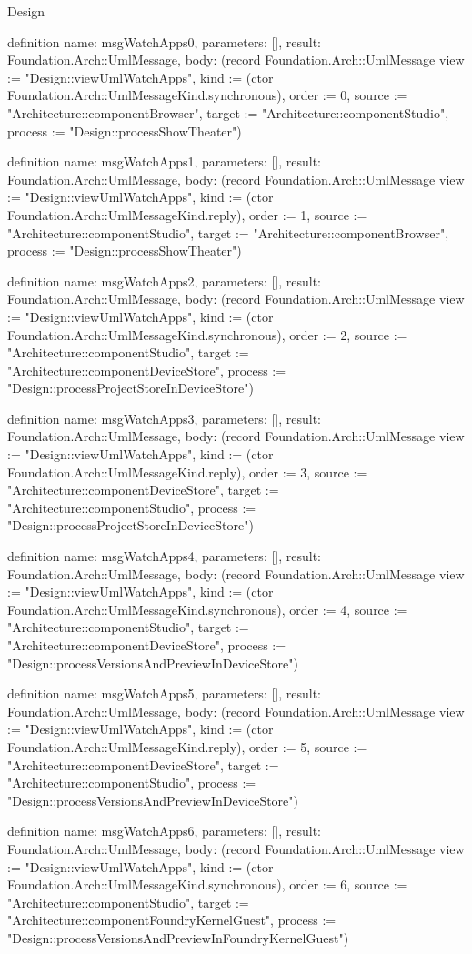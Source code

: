 \begin{lexlean}{Design}
\begin{semanticmodule}
definition{
  name: msgWatchApps0,
  parameters: [],
  result: Foundation.Arch::UmlMessage,
  body: (record Foundation.Arch::UmlMessage {view := "Design::viewUmlWatchApps", kind := (ctor Foundation.Arch::UmlMessageKind.synchronous), order := 0, source := "Architecture::componentBrowser", target := "Architecture::componentStudio", process := "Design::processShowTheater"})
}

definition{
  name: msgWatchApps1,
  parameters: [],
  result: Foundation.Arch::UmlMessage,
  body: (record Foundation.Arch::UmlMessage {view := "Design::viewUmlWatchApps", kind := (ctor Foundation.Arch::UmlMessageKind.reply), order := 1, source := "Architecture::componentStudio", target := "Architecture::componentBrowser", process := "Design::processShowTheater"})
}

definition{
  name: msgWatchApps2,
  parameters: [],
  result: Foundation.Arch::UmlMessage,
  body: (record Foundation.Arch::UmlMessage {view := "Design::viewUmlWatchApps", kind := (ctor Foundation.Arch::UmlMessageKind.synchronous), order := 2, source := "Architecture::componentStudio", target := "Architecture::componentDeviceStore", process := "Design::processProjectStoreInDeviceStore"})
}

definition{
  name: msgWatchApps3,
  parameters: [],
  result: Foundation.Arch::UmlMessage,
  body: (record Foundation.Arch::UmlMessage {view := "Design::viewUmlWatchApps", kind := (ctor Foundation.Arch::UmlMessageKind.reply), order := 3, source := "Architecture::componentDeviceStore", target := "Architecture::componentStudio", process := "Design::processProjectStoreInDeviceStore"})
}

definition{
  name: msgWatchApps4,
  parameters: [],
  result: Foundation.Arch::UmlMessage,
  body: (record Foundation.Arch::UmlMessage {view := "Design::viewUmlWatchApps", kind := (ctor Foundation.Arch::UmlMessageKind.synchronous), order := 4, source := "Architecture::componentStudio", target := "Architecture::componentDeviceStore", process := "Design::processVersionsAndPreviewInDeviceStore"})
}

definition{
  name: msgWatchApps5,
  parameters: [],
  result: Foundation.Arch::UmlMessage,
  body: (record Foundation.Arch::UmlMessage {view := "Design::viewUmlWatchApps", kind := (ctor Foundation.Arch::UmlMessageKind.reply), order := 5, source := "Architecture::componentDeviceStore", target := "Architecture::componentStudio", process := "Design::processVersionsAndPreviewInDeviceStore"})
}

definition{
  name: msgWatchApps6,
  parameters: [],
  result: Foundation.Arch::UmlMessage,
  body: (record Foundation.Arch::UmlMessage {view := "Design::viewUmlWatchApps", kind := (ctor Foundation.Arch::UmlMessageKind.synchronous), order := 6, source := "Architecture::componentStudio", target := "Architecture::componentFoundryKernelGuest", process := "Design::processVersionsAndPreviewInFoundryKernelGuest"})
}


\end{semanticmodule}
\end{lexlean}

